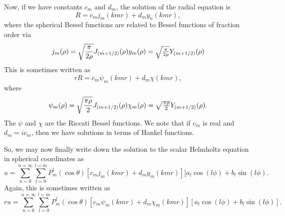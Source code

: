 Now, if we have constants $c_m$ and $d_m$, the solution of the radial
equation is
\begin{equation}
R=c_m j_m (kmr)+d_m y_n(kmr),
\end{equation}
where the spherical Bessel functions are related to Bessel functions
of fraction order via
\begin{equation}
j_m(\rho)=\sqrt{\frac{\pi}{2 \rho}} J_{(m+1/2)}(\rho)
$$   $$
y_m(\rho)=\sqrt{\frac{\pi}{2 \rho}} Y_{(m+1/2)}(\rho)
\end{equation}
This is sometimes written as
\begin{equation}
r R=c_m \psi_m(kmr)+d_m \chi(kmr),
\end{equation}
where
\begin{equation}
\psi_m(\rho)=\sqrt{\frac{\pi \rho }{2 }} J_{(m+1/2)}(\rho)
$$   $$
\chi_m(\rho)=\sqrt{\frac{\pi \rho }{2 }} Y_{(m+1/2)}(\rho).
\end{equation}
The $\psi$ and $\chi$  are the Riccati Bessel functions.
We note that if $c_m$ is real and $d_m=i c_m$, then we have solutions in terms of Hankel functions.

So, we may now finally write down the solution to the scalar Helmholtz equation in spherical coordinates as
\begin{equation}
u=\sum_{n=0}^{n=\infty}
\sum_{l=0}^{l=m}
P_m^l(\cos \theta) [ c_m j_m(kmr)+d_m y_m(kmr) ] 
[a_l \cos (l \phi) +b_l \sin(l \phi).
\end{equation}
Again, this is sometimes written as
\begin{equation}
r u=\sum_{n=0}^{n=\infty}
\sum_{l=0}^{l=m}
P_m^l(\cos \theta) [ c_m \psi_m(kmr)+d_m \chi_m(kmr) ] 
[a_l \cos (l \phi) +b_l \sin(l \phi)].
\end{equation}


